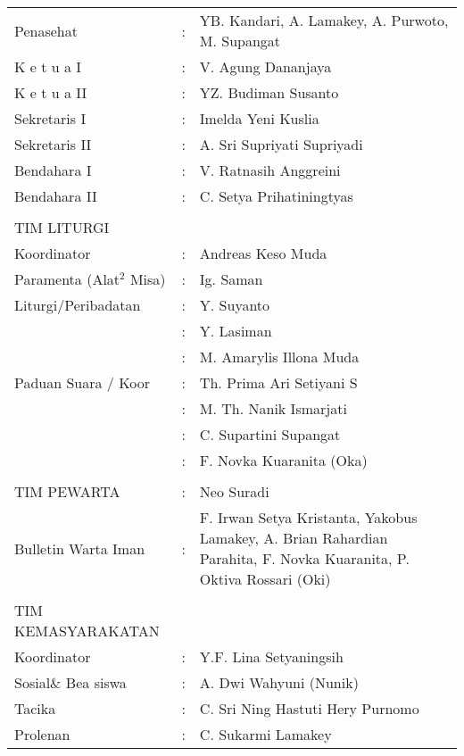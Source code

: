 \documentclass[a5paper,titlepage,11pt]{book}
\begin{document}
\begin{tabular}{p{5cm}cp{5cm}}
Penasehat&:&  YB. Kandari, A. Lamakey, A. Purwoto, M. Supangat \\
K e t u a I&:&  V. Agung Dananjaya\\ 
K e t u a II&:&  YZ. Budiman Susanto\\
Sekretaris I&:&  Imelda Yeni Kuslia\\
Sekretaris II&:&  A. Sri Supriyati Supriyadi\\
Bendahara I&:&  V. Ratnasih Anggreini\\ 
Bendahara II&:&  C. Setya Prihatiningtyas \\  
\\
TIM LITURGI\\
\hspace{0.75cm}Koordinator&:&  Andreas Keso Muda\\
\hspace{0.75cm}Paramenta (Alat$^2$ Misa)&:&  Ig. Saman\\
\hspace{0.75cm}Liturgi/Peribadatan&:&  Y. Suyanto\\
&:&  Y. Lasiman\\
&:&  M. Amarylis Illona Muda\\
\hspace{0.75cm}Paduan Suara / Koor&:&  Th. Prima Ari Setiyani S\\  
&:&  M. Th. Nanik Ismarjati\\
&:&  C. Supartini Supangat\\
&:&  F. Novka Kuaranita (Oka)\\
\\
TIM PEWARTA&:&  Neo Suradi\\
\hspace{0.75cm}Bulletin Warta Iman&:&  F. Irwan Setya Kristanta, Yakobus Lamakey,
  A. Brian Rahardian Parahita, F. Novka Kuaranita,
  P. Oktiva Rossari (Oki)\\
\\
TIM KEMASYARAKATAN \\
\hspace{0.75cm}Koordinator&:&  Y.F. Lina Setyaningsih\\
\hspace{0.75cm}Sosial\& Bea siswa&:&  A. Dwi Wahyuni (Nunik)\\
\hspace{0.75cm}Tacika &:&  C. Sri Ning Hastuti Hery Purnomo\\
\hspace{0.75cm}Prolenan&:&  C. Sukarmi Lamakey\\

\end{tabular}
\end{document}
